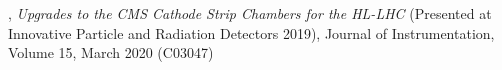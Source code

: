 
, \textit{Upgrades to the CMS Cathode Strip Chambers for the HL-LHC} (Presented at Innovative Particle and Radiation Detectors 2019), Journal of Instrumentation, Volume 15, March 2020 (C03047)